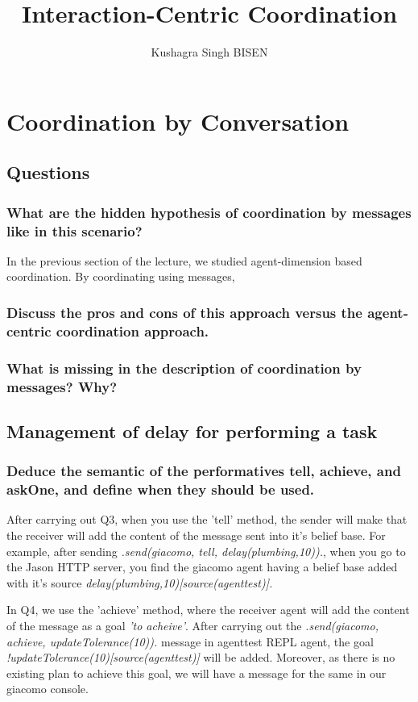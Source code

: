 \documentclass[]{article}
\title{Interaction-Centric Coordination}
\author{Kushagra Singh BISEN}
\begin{document}
\maketitle

\section{Coordination by Conversation}

\subsection{Questions}

\subsubsection{What are the hidden hypothesis of coordination by messages like in this scenario?}
In the previous section of the lecture, we studied agent-dimension based coordination. By coordinating using 
messages,  
\subsubsection{Discuss the pros and cons of this approach versus the agent-centric coordination approach.}
\subsubsection{What is missing in the description of coordination by messages? Why?}

\subsection{Management of delay for performing a task}

\subsubsection{Deduce the semantic of the performatives tell, achieve, and askOne, and define when they should be used.}
After carrying out Q3, when you use the 'tell' method, the sender will make that the receiver will add the content 
of the message sent into it's belief base. For example, after sending \emph{.send(giacomo, tell, delay(plumbing,10)).}, when
you go to the Jason HTTP server, you find the giacomo agent having a belief base added with it's source \emph{delay(plumbing,10)[source(agenttest)].}

In Q4, we use the 'achieve' method, where the receiver agent will add the content of the message as a goal \emph{'to acheive'}.
After carrying out the \emph{.send(giacomo, achieve, updateTolerance(10)).} message in agenttest REPL agent, the goal
\emph{!updateTolerance(10)[source(agenttest)]} will be added. Moreover, as there is no existing plan to achieve this goal, 
we will have a message for the same in our giacomo console.
\end{document}
